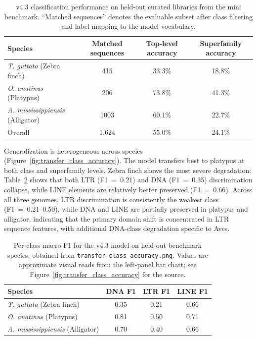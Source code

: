 \documentclass[12pt]{article}
\begin{document}
\begin{table}[h]
\centering
\begin{tabular}{lccc}
\hline
Species & Matched sequences & Top-level accuracy & Superfamily accuracy \\
\hline
\textit{T. guttata} (Zebra finch) & 415 & 33.3\% & 18.8\% \\
\textit{O. anatinus} (Platypus) & 206 & 73.8\% & 41.3\% \\
\textit{A. mississippiensis} (Alligator) & 1003 & 60.1\% & 22.7\% \\
\hline
Overall & 1{,}624 & 55.0\% & 24.1\% \\
\hline
\end{tabular}
\caption{v4.3 classification performance on held-out curated libraries from the mini benchmark. ``Matched sequences'' denotes the evaluable subset after class filtering and label mapping to the model vocabulary.}
\label{tab:mini_benchmark}
\end{table}

Generalization is heterogeneous across species (Figure~\ref{fig:transfer_class_accuracy}). The model transfers best to platypus at both class and superfamily levels. Zebra finch shows the most severe degradation: Table~\ref{tab:mini_benchmark_perclass} shows that both LTR (F1~=~0.21) and DNA (F1~=~0.35) discrimination collapse, while LINE elements are relatively better preserved (F1~=~0.66). Across all three genomes, LTR discrimination is consistently the weakest class (F1~=~0.21--0.50), while DNA and LINE are partially preserved in platypus and alligator, indicating that the primary domain shift is concentrated in LTR sequence features, with additional DNA-class degradation specific to Aves.

\begin{table}[h]
\centering
\caption{Per-class macro F1 for the v4.3 model on held-out benchmark species, obtained from \texttt{transfer\_class\_accuracy.png}. Values are approximate visual reads from the left-panel bar chart; see Figure~\ref{fig:transfer_class_accuracy} for the source.}
\label{tab:mini_benchmark_perclass}
\small
\begin{tabular}{lccc}
\toprule
Species & DNA F1 & LTR F1 & LINE F1 \\
\midrule
\textit{T. guttata} (Zebra finch) & 0.35 & 0.21 & 0.66 \\
\textit{O. anatinus} (Platypus) & 0.81 & 0.50 & 0.71 \\
\textit{A. mississippiensis} (Alligator) & 0.70 & 0.40 & 0.66 \\
\bottomrule
\end{tabular}
\end{table}
\end{document}
